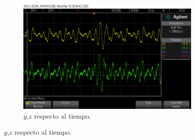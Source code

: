 \documentclass[10pt]{beamer}
\begin{document}
\begin{frame}
\begin{figure}[!ht]
\begin{subfigure}[b]{0.3\textwidth}
	    \includegraphics[trim={6cm 2cm 9cm 2cm},clip,width=\textwidth]{../imagenes/Y7p_Y_vs_Z_signal.png}
	    \caption{$y$,$z$ respecto al tiempo.}
	    \label{fig:Y7p_Y_vs_Z_signal}
	  \end{subfigure}
	\end{figure}	
	\end{frame}			
\end{document}

